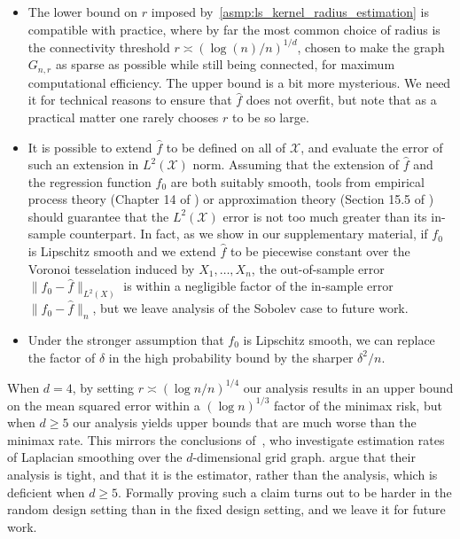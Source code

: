 \documentclass[twoside]{article}
\newcommand{\1}{\mathbf{1}}
\newcommand{\Xset}{\mathcal{X}}
\newcommand{\Leb}{L}
\newcommand{\wh}[1]{\widehat{#1}}
\theoremstyle{definition}
\theoremstyle{remark}
\begin{document}
\begin{itemize}
	\item The lower bound on $r$ imposed by~\ref{asmp:ls_kernel_radius_estimation} is  compatible with practice, where by far the most common choice of radius is the connectivity threshold $r \asymp (\log(n)/n)^{1/d}$, chosen to make the graph $G_{n,r}$ as sparse as possible while still being connected, for maximum computational efficiency. The upper bound is a bit more mysterious. We need it for technical reasons to ensure that $\wh{f}$ does not overfit, but note that as a practical matter one rarely chooses $r$ to be so large.
	\item It is possible to extend $\wh{f}$ to be defined on all of $\Xset$, and evaluate the error of such an extension in $\Leb^2(\Xset)$ norm. Assuming that the extension of $\wh{f}$ and the regression function $f_0$ are both suitably smooth, tools from empirical process theory (Chapter 14 of \cite{wainwright2019}) or approximation theory (Section 15.5 of \citep{johnstone2011}) should guarantee that the $\Leb^2(\Xset)$ error is not too much greater than its in-sample counterpart. In fact, as we show in our supplementary material, if $f_0$ is Lipschitz smooth and we extend $\wh{f}$ to be piecewise constant over the Voronoi tesselation induced by $X_1,\ldots,X_n$, the out-of-sample error $\|f_0 - \wh{f}\|_{\Leb^2(X)}$ is within a negligible factor of the in-sample error $\|f_0 - \wh{f}\|_n$, but we leave analysis of the Sobolev case to future work.
	\item Under the stronger assumption that $f_0$ is Lipschitz smooth, we can replace the factor of $\delta$ in the high probability bound by the sharper $\delta^2/n$.
\end{itemize} 

When $d = 4$, by setting $r \asymp (\log n/n)^{1/4}$ our analysis results in an upper bound on the mean squared error within a $(\log n)^{1/3}$ factor of the minimax risk, but when $d \geq 5$ our analysis yields upper bounds that are much worse than the minimax rate. This mirrors the conclusions of~\cite{sadhanala16}, who investigate estimation rates of Laplacian smoothing over the $d$-dimensional grid graph. \cite{sadhanala16} argue that their analysis is tight, and that it is the estimator, rather than the analysis, which is deficient when $d \geq 5$. Formally proving such a claim turns out to be harder in the random design setting than in the fixed design setting, and we leave it for future work. 
\end{document}
